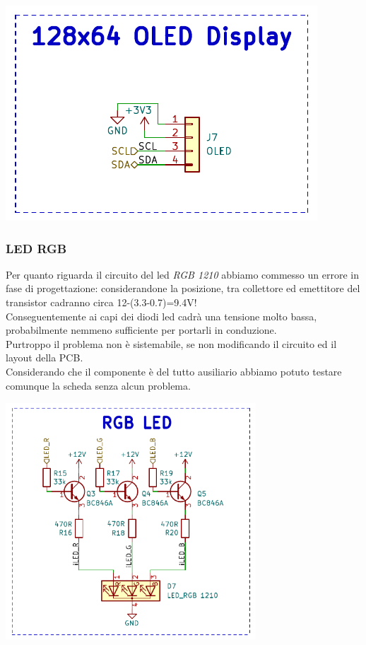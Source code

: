 \begin{center}
\includegraphics[scale=0.7]{figures/image58.png}
\captionsetup{type=figure}
\end{center}

\hypertarget{led-rgb}{%
\subsubsection{\texorpdfstring{\hfill\break
\hfill\break
LED RGB}{  LED RGB}}\label{led-rgb}}

Per quanto riguarda il circuito del led \emph{RGB 1210} abbiamo commesso
un errore in fase di progettazione: considerandone la posizione, tra
collettore ed emettitore del transistor cadranno circa
12-(3.3-0.7)=9.4V!\\
Conseguentemente ai capi dei diodi led cadrà una tensione molto bassa,
probabilmente nemmeno sufficiente per portarli in conduzione.\\
Purtroppo il problema non è sistemabile, se non modificando il circuito
ed il layout della PCB.\\
Considerando che il componente è del tutto ausiliario abbiamo potuto
testare comunque la scheda senza alcun problema.

\begin{center}
\includegraphics[width=3.68946in,height=3.49479in]{figures/image17.png}
\captionsetup{type=figure}
\end{center}

